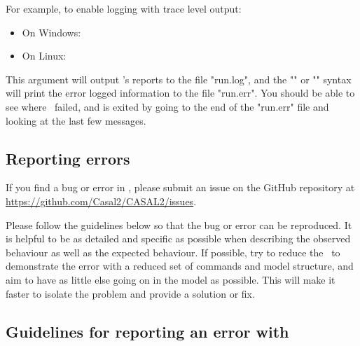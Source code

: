 For example, to enable logging with trace level output:

\begin{itemize}
	\item On Windows: 
	\item On Linux: 
\end{itemize}

This argument will output \CNAME's reports to the file "run.log", and the "" or "" syntax will print the error logged information to the file "run.err". You should be able to see where \CNAME\ failed, and is exited by going to the end of the "run.err" file and looking at the last few messages.

\subsection{Reporting errors\label{sec:ReportingErrors}}

If you find a bug or error in \CNAME, please submit an issue on the GitHub repository at \url{https://github.com/Casal2/CASAL2/issues}.

Please follow the guidelines below so that the bug or error can be reproduced. It is helpful to be as detailed and specific as possible when describing the observed behaviour as well as the expected behaviour. If possible, try to reduce the \config\ to demonstrate the error with a reduced set of commands and model structure, and aim to have as little else going on in the model as possible. This will make it faster to isolate the problem and provide a solution or fix.

\subsection{Guidelines for reporting an error with \CNAME\label{sec:ErrorGuidelines}}

